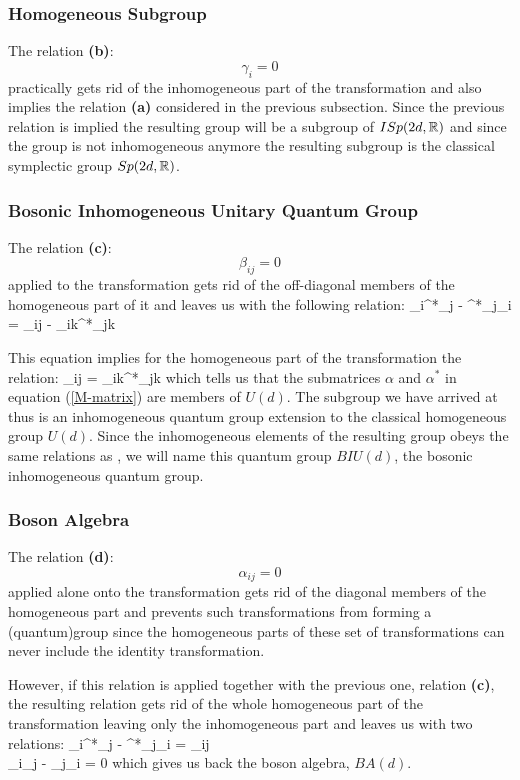 \subsubsection{Homogeneous Subgroup}
The relation {\bf(b)}:
\[
\gamma_i = 0
\]
practically gets rid of the inhomogeneous part of the
transformation and also implies the relation {\bf(a)} considered
in the previous subsection. Since the previous relation is implied
the resulting group will be a subgroup of $ISp(2d,
\mathbb{R})$ and since the group is not inhomogeneous anymore the resulting
subgroup is the classical symplectic group $Sp(2d, \mathbb{R})$.

\subsubsection{Bosonic Inhomogeneous Unitary Quantum Group}
The relation {\bf(c)}:
\[
\beta_{ij} = 0
\]
applied to the transformation gets rid of the off-diagonal members
of the homogeneous part of it and leaves us with the following
relation: 
\beq 
\gamma_i\gamma^*_j - \gamma^*_j\gamma_i = \delta_{ij} - \alpha_{ik}\alpha^*_{jk}
\eeq

This equation implies for the homogeneous
part of the transformation the relation:
\beq
\delta_{ij} = \alpha_{ik}\alpha^*_{jk} 
\eeq
which tells us that the submatrices
$\alpha$ and $\alpha^*$ in equation (\ref{M-matrix}) are
members of $U(d)$. The subgroup we have arrived at thus is an
inhomogeneous quantum group extension to the classical homogeneous
group $U(d)$. Since the inhomogeneous elements of the resulting group
obeys the same relations as \BISp, we will name this quantum group
 $BIU(d)$, the bosonic inhomogeneous quantum group.
 
\subsubsection{Boson Algebra}
The relation {\bf(d)}:
\[
\alpha_{ij} = 0
\]
applied alone onto the transformation gets rid of the diagonal
members of the homogeneous part and prevents such transformations
from forming a (quantum)group since the homogeneous parts of these
set of transformations can never include the identity
transformation.

However, if this relation is applied together with the previous
one, relation {\bf(c)}, the resulting relation gets rid of the
whole homogeneous part of the transformation leaving only the
inhomogeneous part and leaves us with two relations:
\bea
\gamma_i\gamma^*_j - \gamma^*_j\gamma_i = \delta_{ij} \\
\gamma_i\gamma_j - \gamma_j\gamma_i = 0
\eea 
which
gives us back the boson algebra, $BA(d)$.

